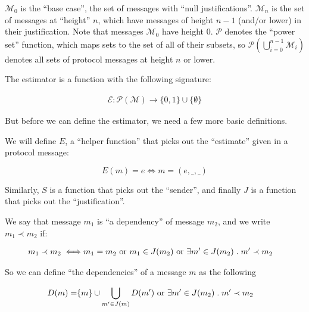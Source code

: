 \documentclass{article}
\theoremstyle{definition}
\begin{document}
$\mathcal{M}_0$ is the ``base case'', the set of messages with ``null justifications''. $\mathcal{M}_n$ is the set of messages at ``height'' $n$, which have messages of height $n-1$ (and/or lower) in their justification. Note that messages $\mathcal{M}_0$ have height $0$. $\mathcal{P}$ denotes the ``power set'' function, which maps sets to the set of all of their subsets, so $\mathcal{P}(\bigcup_{i=0}^{n-1} \mathcal{M}_i)$ denotes all sets of protocol messages at height $n$ or lower.  
	
The estimator is a function with the following signature:
	
\begin{equation}
\begin{split}
    \mathcal{E}:\mathcal{P}(\mathcal{M}) \to \{0, 1\} \cup \{\emptyset\}
\end{split}
\end{equation}

But before we can define the estimator, we need a few more basic definitions.

We will define $E$, a ``helper function'' that picks out the ``estimate'' given in a protocol message:

$$
E(m) = e \iff m = (e, \_, \_)
$$

Similarly, $S$ is a function that picks out the ``sender'', and finally $J$ is a function that picks out the ``justification''.  

We say that message $m_1$ is ``a dependency'' of message $m_2$, and we write $m_1 \prec m_2$ if:

\begin{equation}
\begin{split}
m_1 \prec m_2 \iff & m_1 = m_2 \text{ or } m_1 \in J(m_2) \text{ or } \exists m' \in J(m_2) \hspace{1mm} . \hspace{1mm} m' \prec m_2
\end{split}
\end{equation}

So we can define ``the dependencies'' of a message $m$ as the following

\begin{equation}
\begin{split}
D(m) = &\{m\}\cup \bigcup_{m' \in J(m)} D(m')  \text{ or } \exists m' \in J(m_2) \hspace{1mm} . \hspace{1mm} m' \prec m_2
\end{split}
\end{equation}
\end{document}
